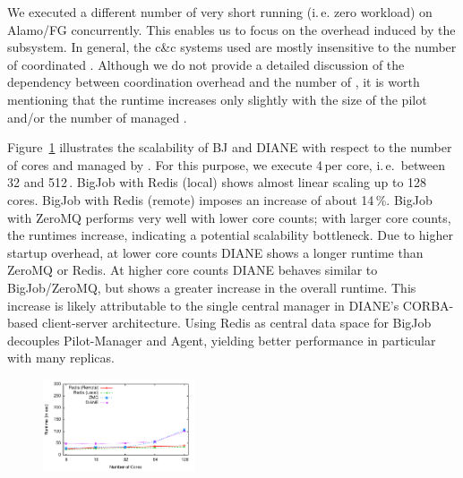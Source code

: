 \documentclass[conference]{IEEEtran}
\begin{document}

We executed a different number of very short running (i.\,e. zero
workload) \cus on Alamo/FG concurrently.  This enables us to focus on
the overhead induced by the \cc subsystem. In general, the c\&c
systems used are mostly insensitive to the number of coordinated \cus.
Although we do not provide a detailed discussion of the dependency
between coordination overhead and the number of \cus, it is worth
mentioning that the runtime increases only slightly with the size of
the pilot and/or the number of managed \cus.


   Figure~\ref{fig:perf_bigjob-varying-cores}
illustrates the scalability of BJ and DIANE with respect to the number
of cores and \cus managed by \pilot. For this purpose, we execute
4\,\cus per core, i.\,e.\ between 32 and 512\,\cus.  BigJob with Redis
(local) shows almost linear scaling up to 128 cores. BigJob with Redis
(remote) imposes an increase of about 14\,\%. BigJob with ZeroMQ
performs very well with lower core counts; with larger core counts,
the runtimes increase, indicating a potential scalability
bottleneck. Due to higher startup overhead, at lower core counts DIANE
shows a longer runtime than ZeroMQ or Redis.  At higher core counts
DIANE behaves similar to BigJob/ZeroMQ, but shows a greater increase
in the overall runtime. This increase is likely attributable to the
single central manager in DIANE's CORBA-based client-server
architecture. Using Redis as central data space for BigJob decouples
Pilot-Manager and Agent, yielding better performance in particular
with many replicas. 

\begin{figure}[t] \centering \up\up
\includegraphics[width=0.4\textwidth]{../perf/bigjob-varying-cores-alamo-noadvert.pdf}
\upp \caption{}
\label{fig:perf_bigjob-varying-cores} \end{figure}
\end{document}

